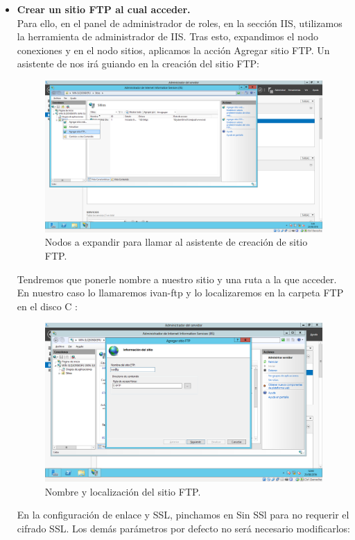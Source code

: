 \begin{itemize}
\begin{itemize}
		\item \textbf{Crear un sitio FTP al cual acceder.}\\
		
		Para ello, en el panel de administrador de roles, en la sección IIS, utilizamos la herramienta de administrador de IIS. Tras esto, expandimos el nodo conexiones y en el nodo sitios, aplicamos la acción Agregar sitio FTP. Un asistente de nos irá guiando en la creación del sitio FTP:\\
		
		\begin{figure}[H]
			\centering
			\includegraphics[width=0.7\linewidth]{AgregarSitioFTP}
			\caption[Agragar Sitio FTP]{Nodos a expandir para llamar al asistente de creación de sitio FTP.}
			\label{fig:AgregarSitioFTP}
		\end{figure}
			
		Tendremos que ponerle nombre a nuestro sitio y una ruta a la que acceder. En nuestro caso lo llamaremos ivan-ftp y lo localizaremos en la carpeta FTP en el disco C :\\
		
		\begin{figure}[H]
			\centering
			\includegraphics[width=0.7\linewidth]{WindowsServerDirectorioFtp}
			\caption[1\_SitioFTP]{Nombre y localización del sitio FTP.}
			\label{fig:NombreyLugarFTP}
		\end{figure}
		
		En la configuración de enlace y SSL, pinchamos en Sin SSl para no requerir el cifrado SSL. Los demás parámetros por defecto no será necesario modificarlos:\\
		

\end{itemize}
\end{itemize}
